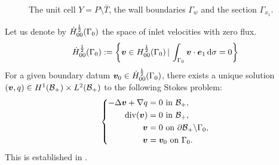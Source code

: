 \documentclass[a4paper,10pt,reqno]{amsart}
\begin{document}
\begin{figure}
    \centering  
    \caption{The unit cell $Y=P\setminus \bar T$, the wall boundaries $\Gamma_w$ and the
    section $\Gamma_{x_1}$.}
    \label{fig:1e8x0}
\end{figure}
Let us denote by $\dot{H}^{\frac{1}{2}}_{00}(\Gamma_0)$ the space   of inlet
velocities with zero flux.
\[
\dot{H}^{\frac{1}{2}}_{00}(\Gamma_0):=\left\{ {\bm v}\in H^{\frac{1}{2}}_{00}(\Gamma_0)\, | \,
\int_{\Gamma_0}{\bm v}\cdot{\bm e}_1\,\mathrm{d} \sigma =0\right\}
\] 
For a given boundary datum ${\bm v}_0\in \dot{H}^{\frac{1}{2}}_{00}(\Gamma_0) $, there exists a unique solution $({\bm v},q)\in
H^{1}(\mathcal{B}_+)\times L^{2}(\mathcal{B}_+)$ to the
following Stokes problem:  
\begin{equation}
\label{eqn:235q7}
\left\{\begin{aligned}
        -\Delta {\bm v}+\nabla q& = 0\textrm{ in } \mathcal{B}_+,\\    
        \mathrm{div}({\bm v}) &= 0 \textrm{ in } \mathcal{B}_+,\\  
        {\bm v}& = 0 \textrm{ on } \partial \mathcal{B}_+\backslash \Gamma_0,\\    
        {\bm v} &= {\bm v}_0 \textrm{ on } \Gamma_0.
\end{aligned}
\right.
\end{equation}
This is established in \cite{nazarov_navier-stokes_2000-1,feppon_asymptotic_2024}.  
    
\end{document}
